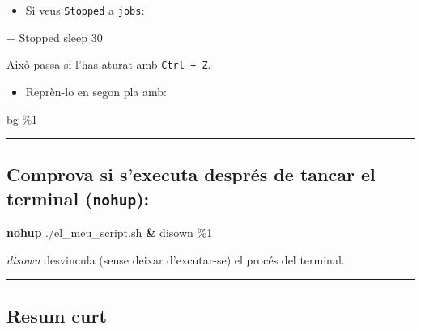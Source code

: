 \documentclass[
  12 pt,
  a4paper,
]{article}
\newenvironment{Shaded}{\begin{snugshade}}{\end{snugshade}}
\newcommand{\BuiltInTok}[1]{#1}
\newcommand{\ExtensionTok}[1]{#1}
\newcommand{\FunctionTok}[1]{\textcolor[rgb]{0.13,0.29,0.53}{\textbf{#1}}}
\newcommand{\KeywordTok}[1]{\textcolor[rgb]{0.13,0.29,0.53}{\textbf{#1}}}
\newcommand{\NormalTok}[1]{#1}
\providecommand{\tightlist}{%
  \setlength{\itemsep}{0pt}\setlength{\parskip}{0pt}}
\begin{document}
\begin{itemize}
\tightlist
\item
  Si veus \texttt{Stopped} a \texttt{jobs}:
\end{itemize}

\begin{Shaded}
\begin{Highlighting}[]
\ExtensionTok{[1]+}\NormalTok{  Stopped              sleep 30}
\end{Highlighting}
\end{Shaded}

Això passa si l'has aturat amb \texttt{Ctrl\ +\ Z}.

\begin{itemize}
\tightlist
\item
  Reprèn-lo en segon pla amb:
\end{itemize}

\begin{Shaded}
\begin{Highlighting}[]
\BuiltInTok{bg}\NormalTok{ \%1}
\end{Highlighting}
\end{Shaded}

\begin{center}\rule{0.5\linewidth}{0.5pt}\end{center}

\subsection{\texorpdfstring{Comprova si s'executa després de tancar el
terminal
(\texttt{nohup}):}{Comprova si s'executa després de tancar el terminal (nohup):}}\label{comprova-si-sexecuta-despruxe9s-de-tancar-el-terminal-nohup}

\begin{Shaded}
\begin{Highlighting}[]
\FunctionTok{nohup}\NormalTok{ ./el\_meu\_script.sh }\KeywordTok{\&}
\BuiltInTok{disown}\NormalTok{ \%1}
\end{Highlighting}
\end{Shaded}

\emph{disown} desvincula (sense deixar d'excutar-se) el procés del
terminal.

\begin{center}\rule{0.5\linewidth}{0.5pt}\end{center}

\subsection{Resum curt}\label{resum-curt}
\end{document}
